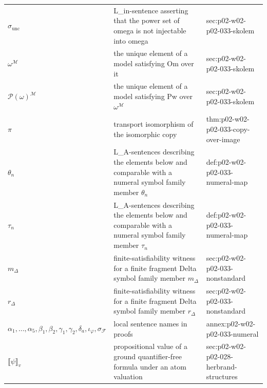 \begin{longtable}{@{}p{}p{}p{}@{}}
\(\sigma_{\mathrm{unc}}\) & L\_in-sentence asserting that the power set of omega is not injectable into omega & sec:\allowbreak{}p02-\allowbreak{}w02-\allowbreak{}p02-\allowbreak{}033-\allowbreak{}skolem \\
\(\omega^{\mathcal M}\) & the unique element of a model satisfying Om over it & sec:\allowbreak{}p02-\allowbreak{}w02-\allowbreak{}p02-\allowbreak{}033-\allowbreak{}skolem \\
\(\mathcal P(\omega)^{\mathcal M}\) & the unique element of a model satisfying Pw over \(\omega^{\mathcal M}\) & sec:\allowbreak{}p02-\allowbreak{}w02-\allowbreak{}p02-\allowbreak{}033-\allowbreak{}skolem \\
\(\pi\) & transport isomorphism of the isomorphic copy & thm:\allowbreak{}p02-\allowbreak{}w02-\allowbreak{}p02-\allowbreak{}033-\allowbreak{}copy-\allowbreak{}over-\allowbreak{}image \\
\(\theta_n\) & L\_A-sentences describing the elements below and comparable with a numeral symbol family member \(\theta_n\) & def:\allowbreak{}p02-\allowbreak{}w02-\allowbreak{}p02-\allowbreak{}033-\allowbreak{}numeral-\allowbreak{}map \\
\(\tau_n\) & L\_A-sentences describing the elements below and comparable with a numeral symbol family member \(\tau_n\) & def:\allowbreak{}p02-\allowbreak{}w02-\allowbreak{}p02-\allowbreak{}033-\allowbreak{}numeral-\allowbreak{}map \\
\(m_\Delta\) & finite-satisfiability witness for a finite fragment Delta symbol family member \(m_\Delta\) & sec:\allowbreak{}p02-\allowbreak{}w02-\allowbreak{}p02-\allowbreak{}033-\allowbreak{}nonstandard \\
\(r_\Delta\) & finite-satisfiability witness for a finite fragment Delta symbol family member \(r_\Delta\) & sec:\allowbreak{}p02-\allowbreak{}w02-\allowbreak{}p02-\allowbreak{}033-\allowbreak{}nonstandard \\
\(\alpha_1,\allowbreak \ldots,\allowbreak \alpha_5,\allowbreak \beta_1,\allowbreak \beta_2,\allowbreak \gamma_1,\allowbreak \gamma_2,\allowbreak \delta_a,\allowbreak \iota_\varphi,\allowbreak \sigma_{\mathcal F}\) & local sentence names in proofs & annex:\allowbreak{}p02-\allowbreak{}w02-\allowbreak{}p02-\allowbreak{}033-\allowbreak{}numeral \\
\(\llbracket\psi\rrbracket_v\) & propositional value of a ground quantifier-free formula under an atom valuation & sec:\allowbreak{}p02-\allowbreak{}w02-\allowbreak{}p02-\allowbreak{}028-\allowbreak{}herbrand-\allowbreak{}structures \\

\end{longtable}
